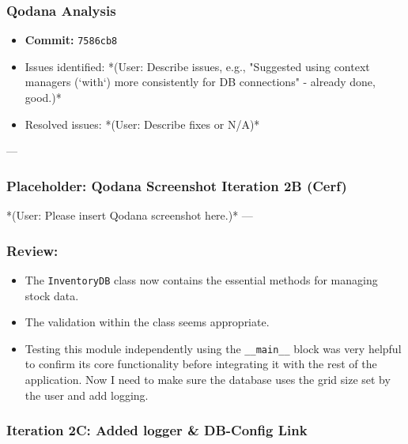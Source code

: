 \subsubsection{Qodana Analysis}
\begin{itemize}
	\item \textbf{Commit:} \verb|7586cb8|
	\item Issues identified: *(User: Describe issues, e.g., "Suggested using context managers (`with`) more consistently for DB connections" - already done, good.)*
	\item Resolved issues: *(User: Describe fixes or N/A)*
\end{itemize}

--- %
\subsubsection*{Placeholder: Qodana Screenshot Iteration 2B (Cerf)}
*(User: Please insert Qodana screenshot here.)*
---

\subsubsection{Review:}
\begin{itemize}
	\item The \verb|InventoryDB| class now contains the essential methods for managing stock data.
	\item The validation within the class seems appropriate.
	\item Testing this module independently using the \verb|__main__| block was very helpful to confirm its core functionality before integrating it with the rest of the application. Now I need to make sure the database uses the grid size set by the user and add logging.
\end{itemize}

\newpage

\subsubsection{Iteration 2C: Added logger \& DB-Config Link}

